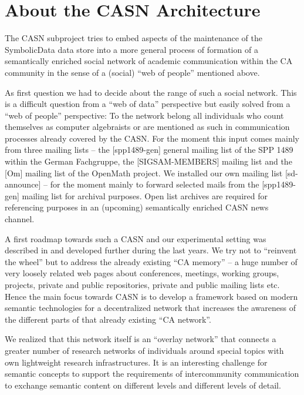 \documentclass{llncs}
\newcommand{\SD}{{\sc Symbo\-lic\-Data}}
\begin{document}
\section{About the CASN Architecture}

The CASN subproject tries to embed aspects of the maintenance of the {\SD}
data store into a more general process of formation of a semantically enriched
social network of academic communication within the CA community in the sense
of a (social) ``web of people'' mentioned above.

As first question we had to decide about the range of such a social network.
This is a difficult question from a ``web of data'' perspective but easily
solved from a ``web of people'' perspective: To the network belong all
individuals who count themselves as computer algebraists or are mentioned as
such in communication processes already covered by the CASN.  For the moment
this input comes mainly from three mailing lists -- the [spp1489-gen] general
mailing list of the SPP 1489 within the German Fachgruppe, the [SIGSAM-MEMBERS]
mailing list and the [Om] mailing list of the OpenMath project.  We installed
our own mailing list [sd-announce] -- for the moment mainly to forward selected
mails from the [spp1489-gen] mailing list for archival purposes.  Open list
archives are required for referencing purposes in an (upcoming) semantically
enriched CASN news channel.

A first roadmap towards such a CASN and our experimental setting was described
in \cite{cicm-14} and developed further during the last years.  We try not to
``reinvent the wheel'' but to address the already existing ``CA memory'' -- a
huge number of very loosely related web pages about conferences, meetings,
working groups, projects, private and public repositories, private and public
mailing lists etc. Hence the main focus towards CASN is to develop a framework
based on modern semantic technologies for a decentralized network that
increases the awareness of the different parts of that already existing ``CA
network''.

We realized that this network itself is an ``overlay network'' that connects a
greater number of research networks of individuals around special topics with
own lightweight research infrastructures.  It is an interesting challenge for
semantic concepts to support the requirements of intercommunity communication
to exchange semantic content on different levels and different levels of
detail.
\medskip
\end{document}
